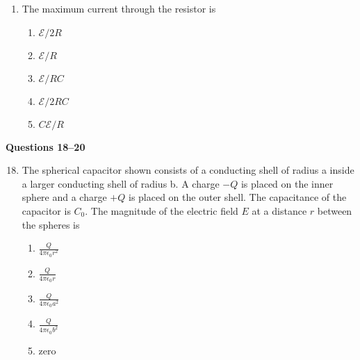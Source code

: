 \documentclass{../../oss-apphys}
\begin{document}
\begin{multicols}{2}
\begin{enumerate}[leftmargin=18pt]
  \item The maximum current through the resistor is
    \begin{enumerate}[noitemsep,topsep=0pt,leftmargin=18pt,label=(\Alph*)]
    \item $\mathcal{E}/2R$
    \item $\mathcal{E}/R$
    \item $\mathcal{E}/RC$
    \item $\mathcal{E}/2RC$
    \item $C\mathcal{E}/R$
    \end{enumerate}
  \end{enumerate}
  \columnbreak
  \textbf{Questions 18--20}
  \begin{enumerate}[leftmargin=18pt]
    \setcounter{enumi}{17}
  \item The spherical capacitor shown consists of a conducting shell of radius a
    inside a larger conducting shell of radius b. A charge $−Q$ is placed on the
    inner sphere and a charge $+Q$ is placed on the outer shell. The
    capacitance of the capacitor is $C_0$. The magnitude of the electric field
    $E$ at a distance $r$ between the spheres is
    \begin{center}
    \end{center}
    \begin{enumerate}[noitemsep,topsep=0pt,leftmargin=18pt,label=(\Alph*)]    
    \item $\displaystyle\frac{Q}{4\pi\epsilon_0r^2}$
    \item $\displaystyle\frac{Q}{4\pi\epsilon_0r}$
    \item $\displaystyle\frac{Q}{4\pi\epsilon_0a^2}$
    \item $\displaystyle\frac{Q}{4\pi\epsilon_0b^2}$
    \item zero
    \end{enumerate}


\end{enumerate}
\end{multicols}
\end{document}

